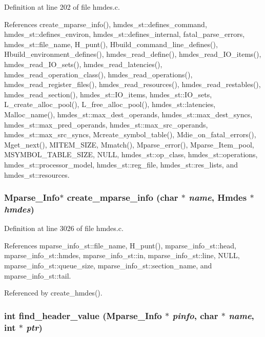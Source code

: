 Definition at line 202 of file hmdes.c.

References create\_\-mparse\_\-info(), hmdes\_\-st::defines\_\-command, hmdes\_\-st::defines\_\-environ, hmdes\_\-st::defines\_\-internal, fatal\_\-parse\_\-errors, hmdes\_\-st::file\_\-name, H\_\-punt(), Hbuild\_\-command\_\-line\_\-defines(), Hbuild\_\-environment\_\-defines(), hmdes\_\-read\_\-define(), hmdes\_\-read\_\-IO\_\-items(), hmdes\_\-read\_\-IO\_\-sets(), hmdes\_\-read\_\-latencies(), hmdes\_\-read\_\-operation\_\-class(), hmdes\_\-read\_\-operations(), hmdes\_\-read\_\-register\_\-files(), hmdes\_\-read\_\-resources(), hmdes\_\-read\_\-restables(), hmdes\_\-read\_\-section(), hmdes\_\-st::IO\_\-items, hmdes\_\-st::IO\_\-sets, L\_\-create\_\-alloc\_\-pool(), L\_\-free\_\-alloc\_\-pool(), hmdes\_\-st::latencies, Malloc\_\-name(), hmdes\_\-st::max\_\-dest\_\-operands, hmdes\_\-st::max\_\-dest\_\-syncs, hmdes\_\-st::max\_\-pred\_\-operands, hmdes\_\-st::max\_\-src\_\-operands, hmdes\_\-st::max\_\-src\_\-syncs, Mcreate\_\-symbol\_\-table(), Mdie\_\-on\_\-fatal\_\-errors(), Mget\_\-next(), MITEM\_\-SIZE, Mmatch(), Mparse\_\-error(), Mparse\_\-Item\_\-pool, MSYMBOL\_\-TABLE\_\-SIZE, NULL, hmdes\_\-st::op\_\-class, hmdes\_\-st::operations, hmdes\_\-st::processor\_\-model, hmdes\_\-st::reg\_\-file, hmdes\_\-st::res\_\-lists, and hmdes\_\-st::resources.
\subsubsection{\setlength{\rightskip}{0pt plus 5cm}\bf{Mparse\_\-Info}$\ast$ create\_\-mparse\_\-info (char $\ast$ {\em name}, \bf{Hmdes} $\ast$ {\em hmdes})}\label{hmdes_8c_adacad712867b0c7c17e6329ee3a0d98}




Definition at line 3026 of file hmdes.c.

References mparse\_\-info\_\-st::file\_\-name, H\_\-punt(), mparse\_\-info\_\-st::head, mparse\_\-info\_\-st::hmdes, mparse\_\-info\_\-st::in, mparse\_\-info\_\-st::line, NULL, mparse\_\-info\_\-st::queue\_\-size, mparse\_\-info\_\-st::section\_\-name, and mparse\_\-info\_\-st::tail.

Referenced by create\_\-hmdes().
\subsubsection{\setlength{\rightskip}{0pt plus 5cm}int find\_\-header\_\-value (\bf{Mparse\_\-Info} $\ast$ {\em pinfo}, char $\ast$ {\em name}, int $\ast$ {\em ptr})}\label{hmdes_8c_c172781c19adf04abeb09bc1d5769470}




